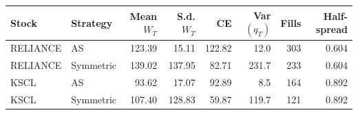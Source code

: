 \begin{tabular}{llrrrrrr}
\toprule
Stock & Strategy & Mean $W_T$ & S.d. $W_T$ & CE & Var$(q_T)$ & Fills & Half-spread \\
\midrule
RELIANCE & AS & 123.39 & 15.11 & 122.82 & 12.0 & 303 & 0.604 \\
RELIANCE & Symmetric & 139.02 & 137.95 & 82.71 & 231.7 & 233 & 0.604 \\
KSCL & AS & 93.62 & 17.07 & 92.89 & 8.5 & 164 & 0.892 \\
KSCL & Symmetric & 107.40 & 128.83 & 59.87 & 119.7 & 121 & 0.892 \\
\bottomrule
\end{tabular}
